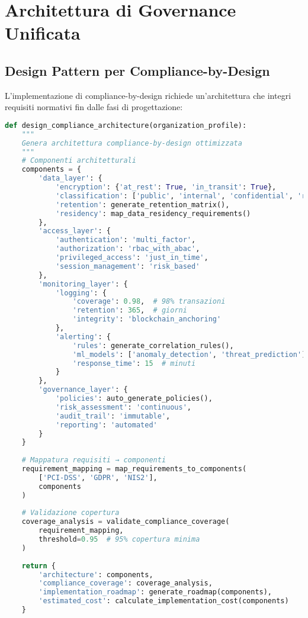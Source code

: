 \section{Architettura di Governance Unificata}

\subsection{Design Pattern per Compliance-by-Design}

L'implementazione di compliance-by-design richiede un'architettura che integri requisiti normativi fin dalle fasi di progettazione:

\begin{lstlisting}[language=Python, caption=Architettura compliance-by-design]
def design_compliance_architecture(organization_profile):
    """
    Genera architettura compliance-by-design ottimizzata
    """
    # Componenti architetturali
    components = {
        'data_layer': {
            'encryption': {'at_rest': True, 'in_transit': True},
            'classification': ['public', 'internal', 'confidential', 'restricted'],
            'retention': generate_retention_matrix(),
            'residency': map_data_residency_requirements()
        },
        'access_layer': {
            'authentication': 'multi_factor',
            'authorization': 'rbac_with_abac',
            'privileged_access': 'just_in_time',
            'session_management': 'risk_based'
        },
        'monitoring_layer': {
            'logging': {
                'coverage': 0.98,  # 98% transazioni
                'retention': 365,  # giorni
                'integrity': 'blockchain_anchoring'
            },
            'alerting': {
                'rules': generate_correlation_rules(),
                'ml_models': ['anomaly_detection', 'threat_prediction'],
                'response_time': 15  # minuti
            }
        },
        'governance_layer': {
            'policies': auto_generate_policies(),
            'risk_assessment': 'continuous',
            'audit_trail': 'immutable',
            'reporting': 'automated'
        }
    }
    
    # Mappatura requisiti → componenti
    requirement_mapping = map_requirements_to_components(
        ['PCI-DSS', 'GDPR', 'NIS2'],
        components
    )
    
    # Validazione copertura
    coverage_analysis = validate_compliance_coverage(
        requirement_mapping,
        threshold=0.95  # 95% copertura minima
    )
    
    return {
        'architecture': components,
        'compliance_coverage': coverage_analysis,
        'implementation_roadmap': generate_roadmap(components),
        'estimated_cost': calculate_implementation_cost(components)
    }
\end{lstlisting}

